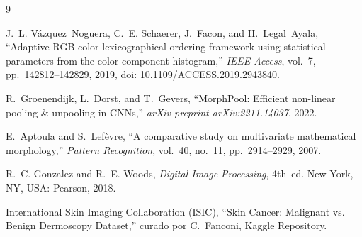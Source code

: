 \documentclass[10pt,a4paper,twocolumn]{article}
\begin{document}
\begin{thebibliography}{9}
\footnotesize

J.~L. Vázquez~Noguera, C.~E. Schaerer, J.~Facon, and H.~Legal~Ayala, ``Adaptive RGB color lexicographical ordering framework using statistical parameters from the color component histogram,'' \emph{IEEE Access}, vol.~7, pp.~142812--142829, 2019, doi: 10.1109/ACCESS.2019.2943840.

R.~Groenendijk, L.~Dorst, and T.~Gevers, ``MorphPool: Efficient non-linear pooling \& unpooling in CNNs,'' \emph{arXiv preprint arXiv:2211.14037}, 2022.

E.~Aptoula and S.~Lefèvre, ``A comparative study on multivariate mathematical morphology,'' \emph{Pattern Recognition}, vol.~40, no.~11, pp.~2914--2929, 2007.

R.~C. Gonzalez and R.~E. Woods, \emph{Digital Image Processing}, 4th~ed. New York, NY, USA: Pearson, 2018.

International Skin Imaging Collaboration (ISIC), ``Skin Cancer: Malignant vs. Benign Dermoscopy Dataset,'' curado por C.~Fanconi, Kaggle Repository.

\end{thebibliography}
\end{document}
